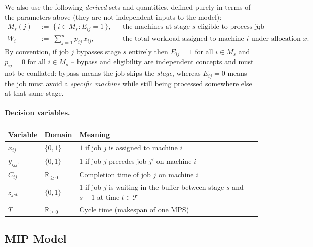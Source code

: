 \documentclass[11pt,a4paper]{article}
\begin{document}
\noindent We also use the following \emph{derived} sets and quantities,
defined purely in terms of the parameters above (they are not
independent inputs to the model):
\begin{align*}
  M_s(j) &\;:=\; \{\, i \in M_s : E_{ij} = 1 \,\}, &&\text{the machines at
    stage $s$ eligible to process job } j, \\
  W_i &\;:=\; \sum_{j=1}^{n} p_{ij}\, x_{ij}, &&\text{the total workload
    assigned to machine } i \text{ under allocation } x.
\end{align*}
By convention, if job $j$ bypasses stage $s$ entirely then $E_{ij}=1$ for
all $i \in M_s$ and $p_{ij}=0$ for all $i \in M_s$ -- bypass and
eligibility are independent concepts and must not be conflated: bypass
means the job skips the \emph{stage}, whereas $E_{ij}=0$ means the job
must avoid a \emph{specific machine} while still being processed
somewhere else at that same stage.

\paragraph{Decision variables.}
\begin{table}[h!]
\centering
\begin{tabular}{@{}lll@{}}
\toprule
Variable & Domain & Meaning \\
\midrule
$x_{ij}$ & $\{0,1\}$ & $1$ if job $j$ is assigned to machine $i$ \\
$y_{ijj'}$ & $\{0,1\}$ & $1$ if job $j$ precedes job $j'$ on machine $i$ \\
$C_{ij}$ & $\mathbb{R}_{\ge 0}$ & Completion time of job $j$ on machine $i$ \\
$z_{jst}$ & $\{0,1\}$ & $1$ if job $j$ is waiting in the buffer between
  stage $s$ and $s{+}1$ at time $t \in \mathcal{T}$ \\
$T$ & $\mathbb{R}_{\ge 0}$ & Cycle time (makespan of one MPS) \\
\bottomrule
\end{tabular}
\end{table}

\subsection{MIP Model}
\end{document}
